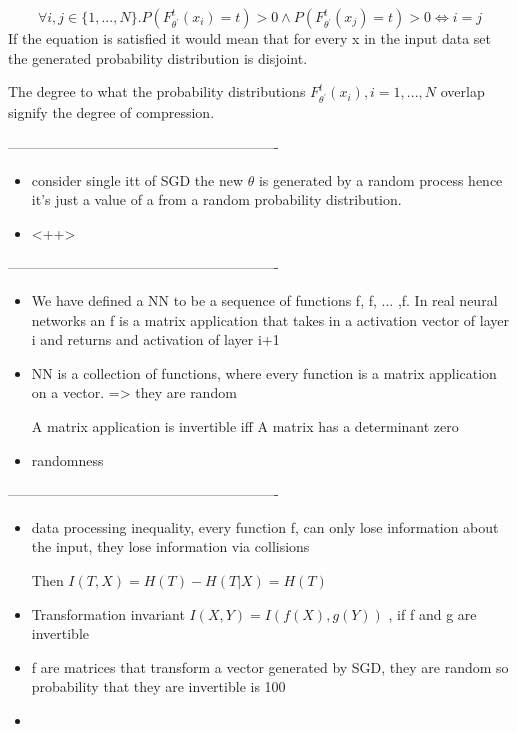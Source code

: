 \begin{equation}
  \forall i, j \in \{1,...,N\}.
  P(F_{\theta^\prime}^t(x_i) = t) > 0 \wedge
  P(F_{\theta^\prime}^t(x_j) = t) > 0 \Leftrightarrow
  i = j
  \label{eq:invF}
\end{equation}
If the equation is satisfied it would mean that for every x in the input data
set the generated probability distribution is disjoint. 

The degree to what the probability distributions $F_{\theta^\prime}^t(x_i), i =
1,...,N$ overlap signify the degree of compression.

----------------------------------------------------------

\begin{itemize}
  \item{
      consider single itt of SGD the new $\theta$ is generated by a random
      process hence it's just a value of a from a random probability
      distribution.
    }
  \item{
      <++>
    }
\end{itemize}

----------------------------------------------------------

\begin{itemize}
  \item{
      We have defined a NN to be a sequence of functions f, f, ... ,f. In real
      neural networks an f is a matrix application that takes in a activation
      vector of layer i and returns and activation of layer i+1
    }
  \item{
      NN is a collection of functions, where every function is a matrix
      application on a vector. => they are random 

      A matrix application is invertible iff A matrix has a determinant zero
    }
  \item{
      randomness
    }
\end{itemize}

----------------------------------------------------------


\begin{itemize}
  \item{
      data processing inequality, every function f, can only lose information
      about the input, they lose information via collisions

      Then $I(T, X) = H(T) - H(T|X) = H(T)$
    }
  \item{
      Transformation invariant $I(X, Y) = I(f(X), g(Y))$ , if f and g are
      invertible
    }
  \item{
      f are matrices that transform a vector generated by SGD, they are random
      so probability that they are invertible is 100%
    }
  \item{
      
    }
\end{itemize}

